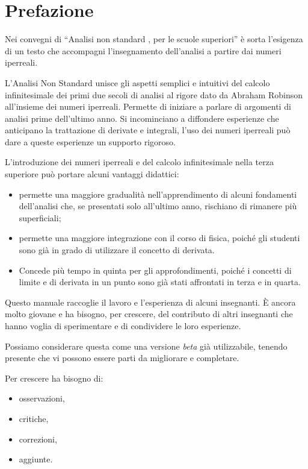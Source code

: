 \pagestyle{matc3page}
\chapter*{Prefazione}

Nei convegni di ``Analisi non standard , per le scuole superiori'' è sorta 
l'esigenza di un testo che accompagni l'insegnamento dell'analisi a partire dai 
numeri iperreali.

L'Analisi Non Standard unisce gli aspetti semplici e intuitivi del 
calcolo infinitesimale dei primi due secoli di analisi al rigore dato da 
Abraham Robinson all'insieme dei numeri iperreali.
Permette di iniziare a parlare di argomenti di analisi prime dell'ultimo anno.
Si incominciano a diffondere esperienze che anticipano la trattazione di 
derivate e integrali, l'uso dei numeri iperreali può dare a queste esperienze 
un supporto rigoroso.

L'introduzione dei numeri iperreali e del calcolo infinitesimale nella terza 
superiore può portare alcuni vantaggi didattici:
\begin{itemize} [nosep]
\item permette una maggiore gradualità nell'apprendimento di alcuni fondamenti 
dell'analisi che, se presentati solo all'ultimo anno, 
rischiano di rimanere più superficiali;
\item permette una maggiore integrazione con il corso di fisica, poiché gli 
studenti sono già in grado di utilizzare il concetto di derivata.
\item Concede più tempo in quinta per gli approfondimenti, poiché i concetti di
limite e di derivata in un punto sono già stati affrontati in terza e in quarta.
\end{itemize}

Questo manuale raccoglie il lavoro e l'esperienza di alcuni insegnanti. È 
ancora molto giovane e ha bisogno, per crescere, del contributo di altri 
insegnanti che hanno voglia di sperimentare e di condividere le loro esperienze.

Possiamo considerare questa come una versione \emph{beta} già utilizzabile, tenendo
presente che vi possono essere parti da migliorare e completare. 

Per crescere ha bisogno di:
\begin{itemize} [nosep]
\item osservazioni,
\item critiche,
\item correzioni,
\item aggiunte.
\end{itemize}

